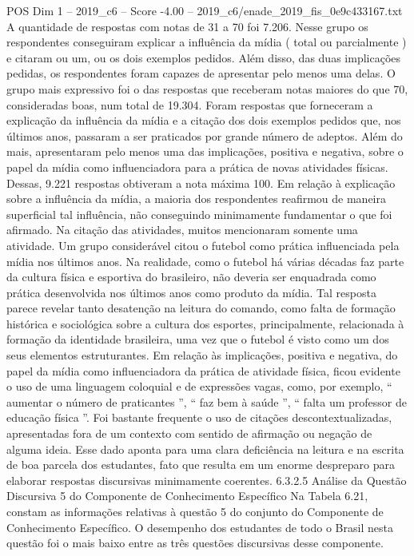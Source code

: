\begin{textsample}{POS Dim 1 – 2019\_c6 – Score -4.00 – 2019\_c6/enade\_2019\_fis\_0e9c433167.txt}
A quantidade de respostas com notas de 31 a 70 foi 7.206.
Nesse grupo os respondentes conseguiram explicar a influência da mídia ( total ou parcialmente ) e citaram ou um, ou os dois exemplos pedidos.
Além disso, das duas implicações pedidas, os respondentes foram capazes de apresentar pelo menos uma delas.
O grupo mais expressivo foi o das respostas que receberam notas maiores do que 70, consideradas boas, num total de 19.304.
Foram respostas que forneceram a explicação da influência da mídia e a citação dos dois exemplos pedidos que, nos últimos anos, passaram a ser praticados por grande número de adeptos.
Além do mais, apresentaram pelo menos uma das implicações, positiva e negativa, sobre o papel da mídia como influenciadora para a prática de novas atividades físicas.
Dessas, 9.221 respostas obtiveram a nota máxima 100.
Em relação à explicação sobre a influência da mídia, a maioria dos respondentes reafirmou de maneira superficial tal influência, não conseguindo minimamente fundamentar o que foi afirmado.
Na citação das atividades, muitos mencionaram somente uma atividade.
Um grupo considerável citou o futebol como prática influenciada pela mídia nos últimos anos.
Na realidade, como o futebol há várias décadas faz parte da cultura física e esportiva do brasileiro, não deveria ser enquadrada como prática desenvolvida nos últimos anos como produto da mídia.
Tal resposta parece revelar tanto desatenção na leitura do comando, como falta de formação histórica e sociológica sobre a cultura dos esportes, principalmente, relacionada à formação da identidade brasileira, uma vez que o futebol é visto como um dos seus elementos estruturantes.
Em relação às implicações, positiva e negativa, do papel da mídia como influenciadora da prática de atividade física, ficou evidente o uso de uma linguagem coloquial e de expressões vagas, como, por exemplo, “ aumentar o número de praticantes ”, “ faz bem à saúde ”, “ falta um professor de educação física ”.
Foi bastante frequente o uso de citações descontextualizadas, apresentadas fora de um contexto com sentido de afirmação ou negação de alguma ideia.
Esse dado aponta para uma clara deficiência na leitura e na escrita de boa parcela dos estudantes, fato que resulta em um enorme despreparo para elaborar respostas discursivas minimamente coerentes. 6.3.2.5 Análise da Questão Discursiva 5 do Componente de Conhecimento Específico Na Tabela 6.21, constam as informações relativas à questão 5 do conjunto do Componente de Conhecimento Específico.
O desempenho dos estudantes de todo o Brasil nesta questão foi o mais baixo entre as três questões discursivas desse componente.

\end{textsample}
